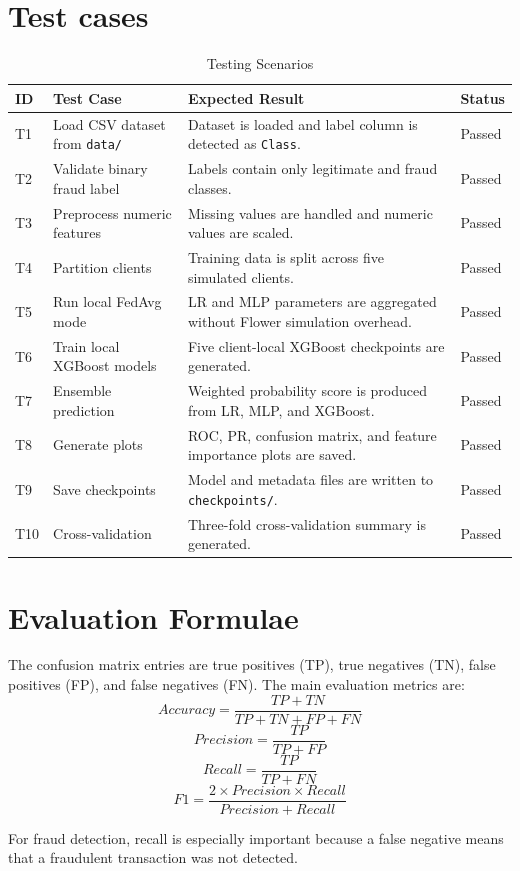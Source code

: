 \section{Test cases}
\begin{table}[H]
\centering
\caption{Testing Scenarios}
\begin{tabular}{|p{1cm}|p{4cm}|p{5cm}|p{3cm}|}
\hline
\textbf{ID} & \textbf{Test Case} & \textbf{Expected Result} & \textbf{Status} \\
\hline
T1 & Load CSV dataset from \texttt{data/} & Dataset is loaded and label column is detected as \texttt{Class}. & Passed \\
\hline
T2 & Validate binary fraud label & Labels contain only legitimate and fraud classes. & Passed \\
\hline
T3 & Preprocess numeric features & Missing values are handled and numeric values are scaled. & Passed \\
\hline
T4 & Partition clients & Training data is split across five simulated clients. & Passed \\
\hline
T5 & Run local FedAvg mode & LR and MLP parameters are aggregated without Flower simulation overhead. & Passed \\
\hline
T6 & Train local XGBoost models & Five client-local XGBoost checkpoints are generated. & Passed \\
\hline
T7 & Ensemble prediction & Weighted probability score is produced from LR, MLP, and XGBoost. & Passed \\
\hline
T8 & Generate plots & ROC, PR, confusion matrix, and feature importance plots are saved. & Passed \\
\hline
T9 & Save checkpoints & Model and metadata files are written to \texttt{checkpoints/}. & Passed \\
\hline
T10 & Cross-validation & Three-fold cross-validation summary is generated. & Passed \\
\hline
\end{tabular}
\end{table}

\section{Evaluation Formulae}
The confusion matrix entries are true positives (TP), true negatives (TN), false positives (FP), and false negatives (FN). The main evaluation metrics are:
\begin{equation}
Accuracy = \frac{TP + TN}{TP + TN + FP + FN}
\end{equation}
\begin{equation}
Precision = \frac{TP}{TP + FP}
\end{equation}
\begin{equation}
Recall = \frac{TP}{TP + FN}
\end{equation}
\begin{equation}
F1 = \frac{2 \times Precision \times Recall}{Precision + Recall}
\end{equation}

For fraud detection, recall is especially important because a false negative means that a fraudulent transaction was not detected.

